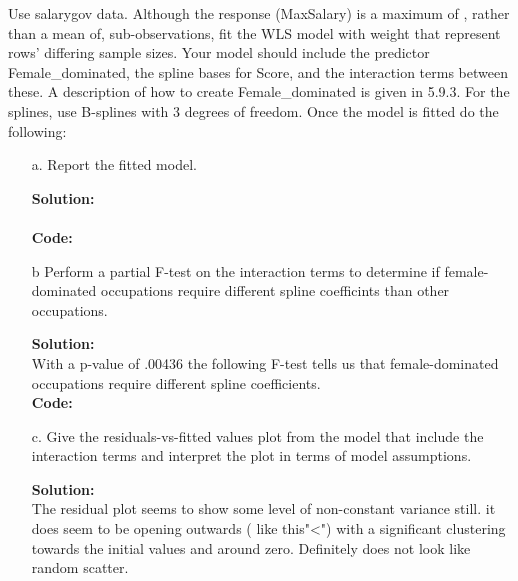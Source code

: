 \documentclass[12pt]{article}
\makeatletter
\theoremstyle{homework}
\newenvironment{exercise}[1]
{\def\@currentlabel{#1}\exercisecore}
{\endexercisecore}
\newcommand{\localhead}[1]{\par\smallskip\noindent\textbf{#1}\nobreak\\}%
\newcommand\solution{\localhead{Solution:}}
\makeatother
\begin{document}
\begin{exercise}{2} Use salarygov data. Although the response (MaxSalary) is a maximum of , rather than a mean of, sub-observations, fit the WLS model 
  with weight that represent rows' differing sample sizes. Your model should include the predictor Female\_dominated, the spline bases for Score, and the interaction terms 
  between these. A description of how to create Female\_dominated is given in 5.9.3. For the splines, use B-splines with 3 degrees of freedom. Once the model is fitted do the following:
  \begin{enumerate}
    \item[a.] Report the fitted model. \\
    \solution\\
    \textbf{Code:}
    \begin{center}
      
      \end{center} 
      \newpage

    \item[b] Perform a partial F-test on the interaction terms to determine if female-dominated occupations require different spline coefficints than other occupations.\\
    \solution With a p-value of .00436 the following F-test tells us that female-dominated occupations require different spline coefficients.\\
    \textbf{Code:}
    \begin{center}
      
      \end{center} 
      \newpage

      \item[c.] Give the residuals-vs-fitted values plot from the model that include the interaction terms and interpret the plot in terms of model assumptions. \\
      \solution  The residual plot seems to show some level of non-constant variance still. it does seem to be opening outwards ( like this"<") with a significant clustering towards 
      the initial values and around zero. Definitely does not look like random scatter. 
      

\end{enumerate}
\end{exercise}
\end{document}
